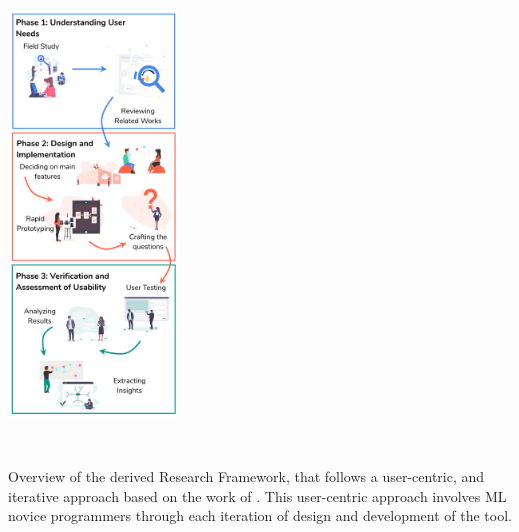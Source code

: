 \documentclass{sigchi-ext}
\begin{document}
\begin{marginfigure}[-5.5pc]
\begin{minipage}{\marginparwidth}
     \centering
    \includegraphics[width=4.5cm,height=12.5cm]{figures/Method-strip.png}
    \caption{Overview of the derived Research Framework, that follows a user-centric, and iterative approach based on the work of \protect\cite{nodalo2019building}. This user-centric approach involves ML novice programmers through each iteration of design and development of the tool.}
    \label{fig:methodology}
    \end{minipage}
\end{marginfigure}
\end{document}
